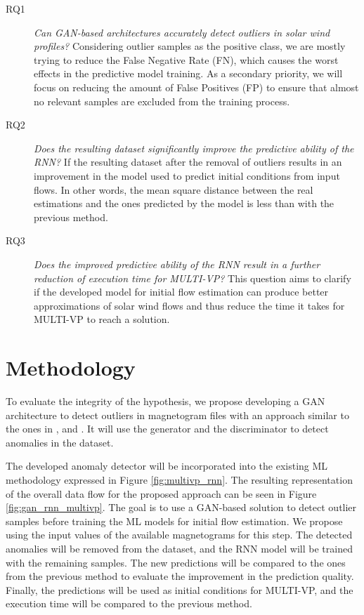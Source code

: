 \begin{description}
    \item[RQ1] \textit{Can GAN-based architectures accurately detect outliers in solar wind profiles?} Considering outlier samples as the positive class, we are mostly trying to reduce the False Negative Rate (FN), which causes the worst effects in the predictive model training. As a secondary priority, we will focus on reducing the amount of False Positives (FP) to ensure that almost no relevant samples are excluded from the training process.
    \item[RQ2] \textit{Does the resulting dataset significantly improve the predictive ability of the RNN?} If the resulting dataset after the removal of outliers results in an improvement in the model used to predict initial conditions from input flows. In other words, the mean square distance between the real estimations and the ones predicted by the model is less than with the previous method.
    \item[RQ3] \textit{Does the improved predictive ability of the RNN result in a further reduction of execution time for MULTI-VP?} This question aims to clarify if the developed model for initial flow estimation can produce better approximations of solar wind flows and thus reduce the time it takes for MULTI-VP to reach a solution.
\end{description}

\section{Methodology}\label{sec:method}
To evaluate the integrity of the hypothesis, we propose developing a GAN architecture to detect outliers in magnetogram files with an approach similar to the ones in \cite{li.etal_MADGANMultivariateAnomaly_2019}, and \cite{bashar.nayak_TAnoGANTimeSeries_2020}. It will use the generator and the discriminator to detect anomalies in the dataset. 

The developed anomaly detector will be incorporated into the existing ML methodology expressed in Figure \ref{fig:multivp_rnn}. The resulting representation of the overall data flow for the proposed approach can be seen in Figure \ref{fig:gan_rnn_multivp}. The goal is to use a GAN-based solution to detect outlier samples before training the ML models for initial flow estimation. We propose using the input values of the available magnetograms for this step. The detected anomalies will be removed from the dataset, and the RNN model will be trained with the remaining samples. The new predictions will be compared to the ones from the previous method to evaluate the improvement in the prediction quality. Finally, the predictions will be used as initial conditions for MULTI-VP, and the execution time will be compared to the previous method.

